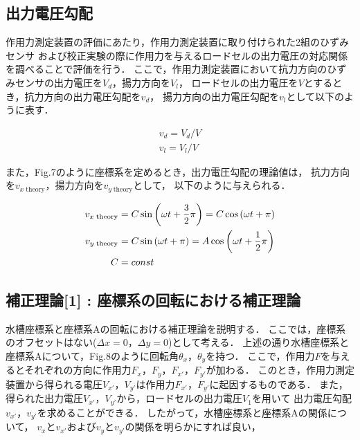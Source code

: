\newpage

\subsection{出力電圧勾配}

作用力測定装置の評価にあたり，作用力測定装置に取り付けられた2組のひずみセンサ
および校正実験の際に作用力を与えるロードセルの出力電圧の対応関係を調べることで評価を行う．
ここで，作用力測定装置において抗力方向のひずみセンサの出力電圧を$V_d$，揚力方向を$V_l$，
ロードセルの出力電圧を$V$とするとき，抗力方向の出力電圧勾配を$v_d$，
揚力方向の出力電圧勾配を$v_l$として以下のように表す．

\begin{align}
  v_d = V_d / V \\
  v_l = V_l / V
\end{align}

また，Fig.7のように座標系を定めるとき，出力電圧勾配の理論値は，
抗力方向を$v_{x\;\mathrm{theory}}$，揚力方向を$v_{y\;\mathrm{theory}}$として，
以下のように与えられる．

\begin{align}
  v_{x\;\mathrm{theory}} & = C \sin\left(\omega t + \frac{3}{2}\pi\right) = C \cos\left(\omega t + \pi
  \right)                                                                                                     \\
  v_{y\;\mathrm{theory}} & = C \sin\left(\omega t + \pi\right) = A \cos\left(\omega t + \frac{1}{2}\pi\right) \\
  C                      & = const \notag
\end{align}

\subsection{補正理論[1] : 座標系の回転における補正理論}

水槽座標系と座標系Aの回転における補正理論を説明する．
ここでは，座標系のオフセットはない($\Delta x = 0$，$\Delta y = 0$)として考える．
上述の通り水槽座標系と座標系Aについて，Fig.8のように回転角$\theta_{x}$，$\theta_{y}$を持つ．
ここで，作用力$F$を与えるとそれぞれの方向に作用力$F_{x}$，$F_{y}$，$F_{x'}$，$F_{y'}$が加わる．
このとき，作用力測定装置から得られる電圧$V_{x'}$，$V_{y'}$は作用力$F_{x'}$，$F_{y'}$に起因するものである．
また，得られた出力電圧$V_{x'}$，$V_{y'}$から，ロードセルの出力電圧$V_1$を用いて
出力電圧勾配$v_{x'}$，$v_{y'}$を求めることができる．
したがって，水槽座標系と座標系Aの関係について，
$v_{x}$と$v_{x'}$および$v_{y}$と$v_{y'}$の関係を明らかにすれば良い，

